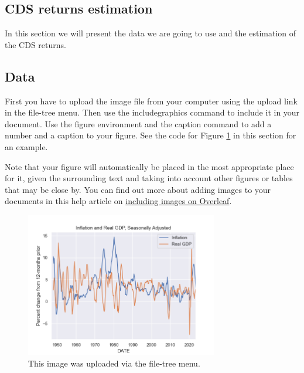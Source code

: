 \documentclass{article}
\begin{document}
\begin{Data science tools for finance final project}
\section{CDS returns estimation}
In this section we will present the data we are going to use and the estimation of the CDS returns.

\subsection{Data}




First you have to upload the image file from your computer using the upload link in the file-tree menu. Then use the includegraphics command to include it in your document. Use the figure environment and the caption command to add a number and a caption to your figure. See the code for Figure \ref{fig:myplot} in this section for an example.

Note that your figure will automatically be placed in the most appropriate place for it, given the surrounding text and taking into account other figures or tables that may be close by. You can find out more about adding images to your documents in this help article on \href{https://www.overleaf.com/learn/how-to/Including_images_on_Overleaf}{including images on Overleaf}.

\begin{figure}
\centering
\includegraphics[width=0.75\textwidth]{../output/example_plot.png}
\caption{\label{fig:myplot}This image was uploaded via the file-tree menu.}
\end{figure}


\end{Data science tools for finance final project}
\end{document}
